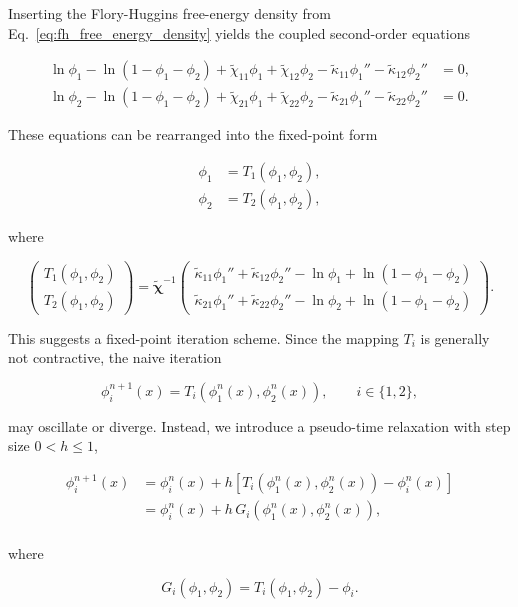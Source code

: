 \documentclass[12pt]{article}
\begin{document}
Inserting the Flory-Huggins free-energy density from Eq.~\eqref{eq:fh_free_energy_density} yields the coupled second-order equations

\[
\begin{aligned}
\ln \phi_1 - \ln(1-\phi_1-\phi_2)
+ \tilde\chi_{11}\phi_1 + \tilde\chi_{12}\phi_2
- \tilde\kappa_{11}\phi_1'' - \tilde\kappa_{12}\phi_2''
&=0, \\
\ln \phi_2 - \ln(1-\phi_1-\phi_2)
+ \tilde\chi_{21}\phi_1 + \tilde\chi_{22}\phi_2
- \tilde\kappa_{21}\phi_1'' - \tilde\kappa_{22}\phi_2''
&= 0.
\end{aligned}
\]

These equations can be rearranged into the fixed-point form

\[
\begin{aligned}
\phi_1 &= T_1(\phi_1,\phi_2), \\
\phi_2 &= T_2(\phi_1,\phi_2),
\end{aligned}
\]

where

\[
\begin{pmatrix}
T_1(\phi_1,\phi_2) \\
T_2(\phi_1,\phi_2)
\end{pmatrix}
=
\boldsymbol{\tilde{\chi}}^{-1}
\begin{pmatrix}
\tilde\kappa_{11}\phi_1'' + \tilde\kappa_{12}\phi_2'' - \ln \phi_1 + \ln(1-\phi_1-\phi_2)  \\
\tilde\kappa_{21}\phi_1'' + \tilde\kappa_{22}\phi_2'' - \ln \phi_2 + \ln(1-\phi_1-\phi_2) 
\end{pmatrix}.
\]

This suggests a fixed-point iteration scheme. Since the mapping \(T_i\) is generally not contractive, the naive iteration

\[
\phi_i^{n+1}(x)=T_i(\phi_1^n(x),\phi_2^n(x)),
\qquad i\in\{1,2\},
\]

may oscillate or diverge. Instead, we introduce a pseudo-time relaxation with step size \(0<h\le 1\),

\[
\begin{aligned}
\phi_i^{n+1}(x)
&=
\phi_i^n(x)+h\left[T_i(\phi_1^n(x),\phi_2^n(x))-\phi_i^n(x)\right]\\
&=
\phi_i^n(x)+h\,G_i(\phi_1^n(x),\phi_2^n(x)),\\
\end{aligned}
\]

where

\[
G_i(\phi_1,\phi_2)=T_i(\phi_1,\phi_2)-\phi_i.
\]
\end{document}
